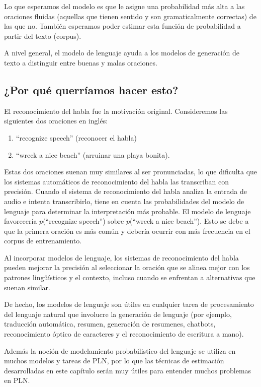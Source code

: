 Lo que esperamos del modelo es que le asigne una probabilidad más alta a las oraciones fluidas (aquellas que tienen sentido y son gramaticalmente correctas) de las que no. También esperamos poder estimar esta función de probabilidad a partir del texto (corpus).

A nivel general, el modelo de lenguaje ayuda a los modelos de generación de texto a distinguir entre buenas y malas oraciones.


\subsection{¿Por qué querríamos hacer esto?}

El reconocimiento del habla fue la motivación original. Consideremos las siguientes dos oraciones en inglés:
\begin{enumerate}
 \item ``recognize speech''  (reconocer el habla)
 \item ``wreck a nice beach'' (arruinar una playa bonita).
\end{enumerate}

Estas dos oraciones suenan muy similares al ser pronunciadas, lo que dificulta que los sistemas automáticos de reconocimiento del habla las transcriban con precisión. Cuando el sistema de reconocimiento del habla analiza la entrada de audio e intenta transcribirlo, tiene en cuenta las probabilidades del modelo de lenguaje para determinar la interpretación más probable.
El modelo de lenguaje favorecería $p$(``recognize speech'') sobre $p$(``wreck a nice beach'').
Esto se debe a que la primera oración es más común y debería ocurrir con más frecuencia en el corpus de entrenamiento.

Al incorporar modelos de lenguaje, los sistemas de reconocimiento del habla pueden mejorar  la precisión al seleccionar la oración que se alinea mejor con los patrones lingüísticos y el contexto, incluso cuando se enfrentan a alternativas que suenan similar.

De hecho, los modelos de lenguaje son útiles en cualquier tarea de procesamiento del lenguaje natural que involucre la generación de lenguaje (por ejemplo, traducción automática, resumen, generación de resumenes, chatbots,  reconocimiento óptico de caracteres y el reconocimiento de escritura a mano).

Además la noción de modelamiento probabilistico del lenguaje se utiliza en muchos modelos y tareas de PLN, por lo que las técnicas de estimación desarrolladas en este capítulo serán muy útiles para entender muchos problemas en PLN.


